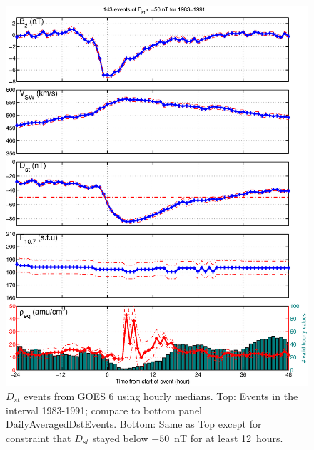 \documentclass[10pt,twocolumn]{article}
\begin{document}
\begin{figure}[tp!]
\includegraphics[scale=0.40]{paperfigures/stormavs-dd12.eps}
\caption{$D_{st}$ events from GOES 6 using hourly medians. Top: Events in the interval 1983-1991; compare to bottom panel {DailyAveragedDstEvents}. Bottom: Same as Top except for constraint that $D_{st}$ stayed below $-50$~nT for at least 12~hours.}
\label{HourlyAveragedDstEvents}
\end{figure}

\clearpage
\end{document}
